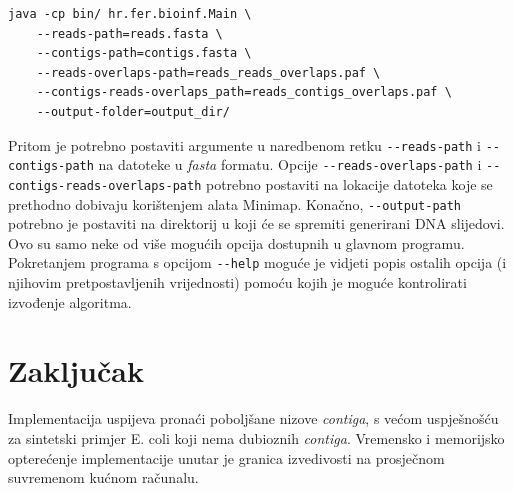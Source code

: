 \documentclass[times, utf8, seminar, numeric]{fer}
\begin{document}
\begin{verbatim}
java -cp bin/ hr.fer.bioinf.Main \
    --reads-path=reads.fasta \
    --contigs-path=contigs.fasta \
    --reads-overlaps-path=reads_reads_overlaps.paf \
    --contigs-reads-overlaps_path=reads_contigs_overlaps.paf \
    --output-folder=output_dir/
\end{verbatim}

Pritom je potrebno postaviti argumente u naredbenom retku \verb^--reads-path^ i \verb^--contigs-path^ na datoteke u \textit{fasta} formatu. Opcije \verb^--reads-overlaps-path^ i \verb^--contigs-reads-overlaps-path^ potrebno
postaviti na lokacije datoteka koje se prethodno dobivaju korištenjem alata Minimap.
Konačno, \verb^--output-path^ potrebno je postaviti na direktorij u koji će se
spremiti generirani DNA slijedovi. Ovo su samo neke od više mogućih opcija dostupnih
u glavnom programu. Pokretanjem programa s opcijom \verb^--help^ moguće je vidjeti
popis ostalih opcija (i njihovim pretpostavljenih vrijednosti) pomoću kojih je moguće kontrolirati izvođenje algoritma.

\chapter{Zaključak}
Implementacija uspijeva pronaći poboljšane nizove \textit{contiga}, s većom uspješnošću za sintetski primjer E. coli koji nema dubioznih \textit{contiga}. Vremensko i memorijsko opterećenje implementacije unutar je granica izvedivosti na prosječnom suvremenom kućnom računalu.



\end{document}
